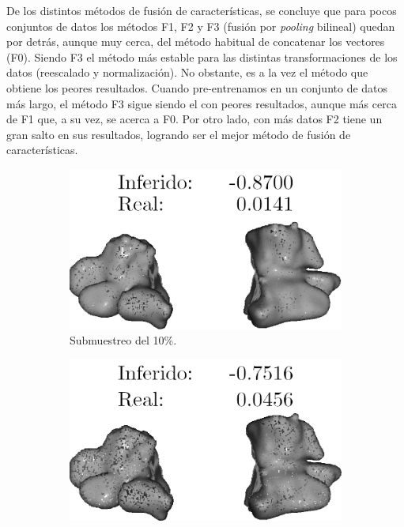 De los distintos métodos de fusión de características, se concluye que para 
pocos conjuntos de datos los métodos F1, F2 y F3 (fusión por \emph{pooling} bilineal) quedan por detrás, aunque 
muy cerca, del método habitual de concatenar los vectores (F0). Siendo F3 el método 
más estable para las distintas transformaciones de los datos (reescalado y normalización). 
No obstante, es a la vez el método que obtiene los peores resultados. 
Cuando pre-entrenamos en un conjunto de datos más largo, el método F3 sigue siendo 
el con peores resultados, aunque más cerca de F1 que, a su vez, se acerca a F0. 
Por otro lado, con más datos F2 tiene un gran salto en sus resultados, 
logrando ser el mejor método de fusión de características. 

\begin{figure}[htp]
  \begin{subfigure}[b]{0.31\textwidth}
  \centering
    \includegraphics[width=\textwidth]{imagenes/chapter6/Maxiliar100014_7.png}
  \caption{Submuestreo del 10\%.}
\end{subfigure}\hspace{10pt}
  \begin{subfigure}[b]{0.31\textwidth}
  \centering
    \includegraphics[width=\textwidth]{imagenes/chapter6/Maxiliar100014_9.png}

\end{subfigure}
\end{figure}
